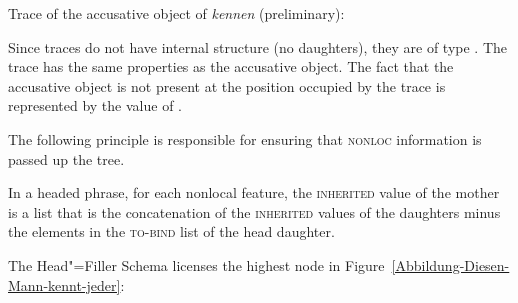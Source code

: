 \eas
\label{le-spur-acc-o-kennen}
Trace of the accusative object of \emph{kennen} (preliminary):\\
\zs

\noindent
Since traces do not have internal structure (no daughters), they are of type .
The trace has the same properties as the accusative object. The fact that the accusative object is not present at the position occupied by the trace
is represented by the value of \slasch. 
%

The following principle is responsible for ensuring that \textsc{nonloc} information is passed up the tree.

\begin{samepage}
\begin{principle-break}
\label{Prinzip-der-Nichtlokalen-Merkmale}
In a headed phrase, for each nonlocal feature, the \textsc{inherited} value of the mother is a list
that is the concatenation of the \textsc{inherited} values of the daughters minus the elements in the
\textsc{to-bind} list of the head daughter.
\end{principle-break}
\end{samepage}

\noindent
The Head"=Filler Schema licenses the highest node in Figure~\vref{Abbildung-Diesen-Mann-kennt-jeder}:

